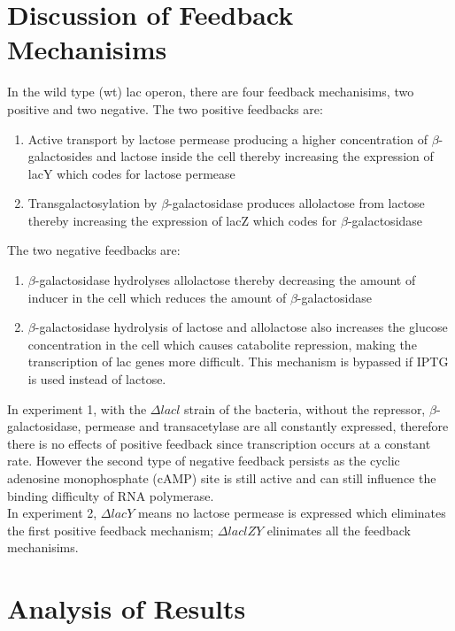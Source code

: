 \documentclass{article}
\begin{document}
\section{Discussion of Feedback Mechanisims}
In the wild type (wt) lac operon, there are four feedback mechanisims, two positive and two negative. The two positive feedbacks are:
\begin{enumerate}
  \item Active transport by lactose permease producing a higher concentration of $\beta$-galactosides and lactose inside the cell thereby increasing the expression of lacY which codes for lactose permease
  \item Transgalactosylation by $\beta$-galactosidase produces allolactose from lactose thereby increasing the expression of lacZ which codes for $\beta$-galactosidase
\end{enumerate}
The two negative feedbacks are:
\begin{enumerate}
  \item $\beta$-galactosidase hydrolyses allolactose thereby decreasing the amount of inducer in the cell which reduces the amount of $\beta$-galactosidase
  \item $\beta$-galactosidase hydrolysis of lactose and allolactose also increases the glucose concentration in the cell which causes catabolite repression, making the transcription of lac genes more difficult. This mechanism is bypassed if IPTG is used instead of lactose.
\end{enumerate}
In experiment 1, with the $\Delta lacl$ strain of the bacteria, without the repressor, $\beta$-galactosidase, permease and transacetylase are all constantly expressed, therefore there is no effects of positive feedback since transcription occurs at a constant rate. However the second type of negative feedback persists as the cyclic adenosine monophosphate (cAMP) site is still active and can still influence the binding difficulty of RNA polymerase.\\
In experiment 2, $\Delta lacY$ means no lactose permease is expressed which eliminates the first positive feedback mechanism; $\Delta laclZY$ elinimates all the feedback mechanisims.
\section{Analysis of Results}



\end{document}
